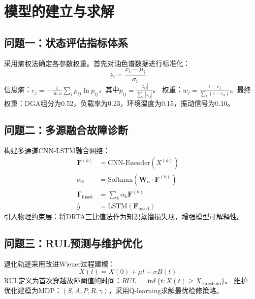 \newpage
\section{模型的建立与求解}

\subsection{问题一：状态评估指标体系}
采用熵权法确定各参数权重。首先对油色谱数据进行标准化：
$$z_i = \frac{x_i - \mu_i}{\sigma_i}$$
信息熵：$e_j = -\frac{1}{\ln n}\sum_i p_{ij} \ln p_{ij}$，其中$p_{ij} = \frac{|z_{ij}|}{\sum_i |z_{ij}|}$。
权重：$w_j = \frac{1-e_j}{\sum_k(1-e_k)}$。最终权重：DGA组分为0.52，负载率为0.23，环境温度为0.15，振动信号为0.10。

\subsection{问题二：多源融合故障诊断}
构建多通道CNN-LSTM融合网络：
\begin{align}
\mathbf{F}^{(k)} &= \text{CNN-Encoder}(X^{(k)}) \\
\alpha_k &= \text{Softmax}\left(\mathbf{W}_\alpha \cdot \mathbf{F}^{(k)}\right) \\
\mathbf{F}_{\text{fused}} &= \sum_k \alpha_k \mathbf{F}^{(k)} \\
\hat{y} &= \text{LSTM}(\mathbf{F}_{\text{fused}})
\end{align}
引入物理约束层：将DRTA三比值法作为知识蒸馏损失项，增强模型可解释性。

\subsection{问题三：RUL预测与维护优化}
退化轨迹采用改进Wiener过程建模：
$$X(t) = X(0) + \mu t + \sigma B(t)$$
RUL定义为首次穿越故障阈值的时间：$RUL = \inf\{t: X(t) \geq X_{\text{threshold}}\}$。
维护优化建模为MDP：$(S,A,P,R,\gamma)$，采用Q-learning求解最优检修策略。
